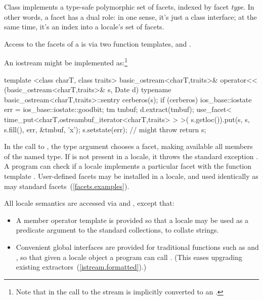 \pnum
Class
implements a type-safe polymorphic set of facets, indexed by facet
\textit{type}.
In other words, a facet has a dual role: in one
sense, it's just a class interface; at the same time, it's an index
into a locale's set of facets.

\pnum
Access to the facets of a
is via two function templates,
and
.

\pnum
\enterexample
An iostream
might be implemented as:\footnote{Note that in the call to
the stream is implicitly converted to an
.}

\begin{codeblock}
template <class charT, class traits>
basic_ostream<charT,traits>&
operator<< (basic_ostream<charT,traits>& s, Date d) {
  typename basic_ostream<charT,traits>::sentry cerberos(s);
  if (cerberos) {
    ios_base::iostate err = ios_base::iostate::goodbit;
    tm tmbuf; d.extract(tmbuf);
    use_facet< time_put<charT,ostreambuf_iterator<charT,traits> > >(
      s.getloc()).put(s, s, s.fill(), err, &tmbuf, 'x');
    s.setstate(err);            // might throw
  }
  return s;
}
\end{codeblock}
\exitexample

\pnum
In the call to
,
the type argument chooses a facet, making available all members
of the named type.
If
is not present in a
locale,
it throws the standard exception
.
A \Cpp program can check if a locale implements a particular
facet with the
function template
.
User-defined facets may be installed in a locale, and used identically as
may standard facets~(\ref{facets.examples}).

\pnum
\enternote
All locale semantics are accessed via
and
,
except that:

\begin{itemize}
\item
A member operator template
is provided so that a locale may be used as a predicate argument to
the standard collections, to collate strings.
\item
Convenient global interfaces are provided for traditional
functions such as
and
,
so that given a locale
object  a \Cpp program can call
.
(This eases upgrading existing extractors~(\ref{istream.formatted}).)
\exitnote
\end{itemize}

